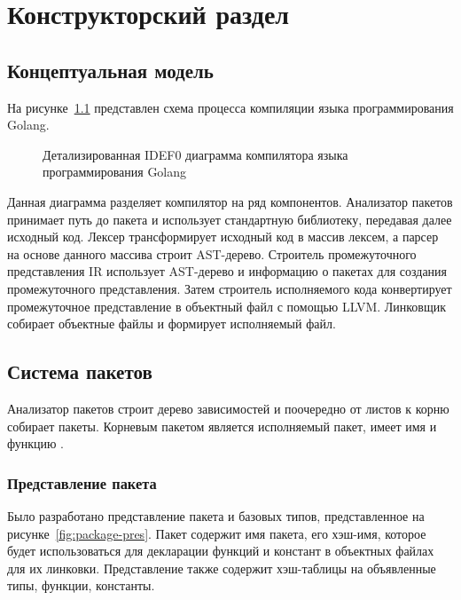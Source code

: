 \chapter{Конструкторский раздел}
\label{cha:design}


\section{Концептуальная модель}


На рисунке~\ref{fig:idef-a0-full} представлен схема процесса компиляции языка программирования Golang.

\begin{figure}[h]
    \centering

    

    \caption{Детализированная IDEF0 диаграмма компилятора языка программирования Golang}
    \label{fig:idef-a0-full}
\end{figure}

Данная диаграмма разделяет компилятор на ряд компонентов.
Анализатор пакетов принимает путь до пакета и использует стандартную библиотеку, передавая далее исходный код.
Лексер трансформирует исходный код в массив лексем, а парсер на основе данного массива строит AST-дерево.
Строитель промежуточного представления IR использует AST-дерево и информацию о пакетах для создания промежуточного представления.
Затем строитель исполняемого кода конвертирует промежуточное представление в объектный файл с помощью LLVM.
Линковщик собирает объектные файлы и формирует исполняемый файл.


\section{Система пакетов}

Анализатор пакетов строит дерево зависимостей и поочередно от листов к корню собирает пакеты.
Корневым пакетом является исполняемый пакет, имеет имя  и функцию .

\subsection*{Представление пакета}

Было разработано представление пакета и базовых типов, представленное на рисунке~\ref{fig:package-pres}.
Пакет содержит имя пакета, его хэш-имя, которое будет использоваться для декларации функций и констант в объектных файлах для их линковки.
Представление также содержит хэш-таблицы на объявленные типы, функции, константы.


